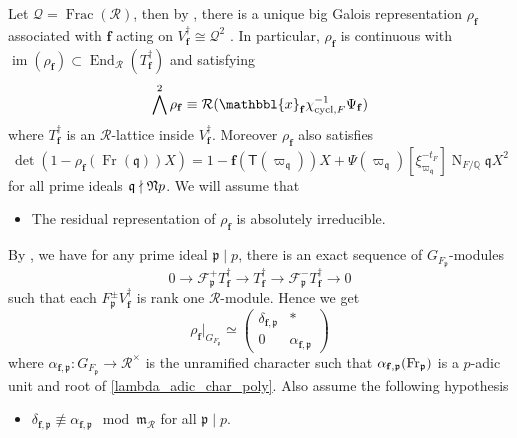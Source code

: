 \documentclass[10pt]{amsart}
\makeatletter
\numberwithin{equation}{section}
\newcommand{\mylabel}[2]{#2\def\@currentlabel{#2}\label{#1}}
\theoremstyle{definition}
\theoremstyle{remark} %
\newcommand{\msf}{\mathsf}
\newcommand{\mrm}{\mathrm}
\newcommand{\f}{\mathbf{f}}
\newcommand{\scrF}{\mathscr{F}}
\newcommand{\p}{\mathfrak{p}}
\newcommand{\Q}{\mathbb{Q}}
\newcommand{\R}{\mathcal{R}}
\makeatother
\begin{document}
	Let $ \mathcal{Q} = \operatorname{Frac}(\R) $, then by \cite[Theorem 1]{hida89reps}, there is a unique big Galois representation $ \rho_{\f} $ associated with $ \f $ acting on $ V_\f^{\dagger} \cong \mathcal{Q}^2 $ . In particular, $ \rho_{\f} $ is continuous with $ \operatorname{im}(\rho_{\f}) \subset \operatorname{End}_{\R}(T_\f^\dagger) $ and satisfying 
	\begin{equation}
		\bigwedge^2\rho_{\f} \equiv \R( \mathbbl{x}_{\f}\chi_{\mrm{cycl},F}^{-1}\Psi_{\f})
	\end{equation}  
	where $ T_\f^\dagger$ is an $ \R $-lattice inside $ V_{\f}^{\dagger} $. Moreover $ \rho_{\f} $ also satisfies 
	\begin{equation}
		\label{lambda_adic_char_poly}
		\det(1-\rho_{\f}(\operatorname{Fr}(\mathfrak{q}))X) = 1 -\f(\msf{T}(\varpi_{\mathfrak{q}}))X + \Psi(\varpi_{\mathfrak{q}})[\xi_{\varpi_{\mathfrak{q}}}^{-t_F}]\operatorname{N}_{F/\Q}\mathfrak{q}X^2
	\end{equation}
	for all prime ideals $ \mathfrak{q} \nmid \frak{N}p $. 
	We will assume that	
	\begin{itemize}
		\item[\mylabel{Irr}{\textbf{(Irr)}}]  The residual representation of $ \rho_{\f} $ is absolutely irreducible.
	\end{itemize}
	By \cite[Theorem 2.2.2]{Wil88}, we have for any prime ideal $ \p \mid p $, there is an exact sequence of $ G_{F_{\p}} $-modules
	$$ 0 \rightarrow \scrF^+_{\p} T_{\f}^{\dagger} \rightarrow T_{\f}^{\dagger} \rightarrow \scrF^-_{\p}T_{\f}^{\dagger} \rightarrow 0 $$
	such that each $  F_{\p}^{\pm} V_{\f}^{\dagger} $ is rank one $ \mathcal{R} $-module.  Hence we get	 
	\begin{equation*}
		\rho_{\f}|_{G_{F_{\p}}} \simeq \begin{pmatrix}
			\delta_{\f,\p} &* \\
			0 &\alpha_{\f,\p}
		\end{pmatrix}
	\end{equation*}
	where $ \alpha_{\f,\p} \colon G_{F_{\p}} \rightarrow \R^\times $ is the unramified character such that $ \alpha_{\f,\p}(\mrm{Fr}_{\frak{p}}) $ is a $ p $-adic unit and root of \eqref{lambda_adic_char_poly}.	
	Also assume the following hypothesis
	\begin{itemize}
		\item[\mylabel{DIST}{\textbf{(Dist)}}] $ \delta_{\f,\p} \not\equiv \alpha_{\f,\p}\mod\mathfrak{m}_{\R} $ for all $ \p \mid p $.
	\end{itemize}
\end{document}
